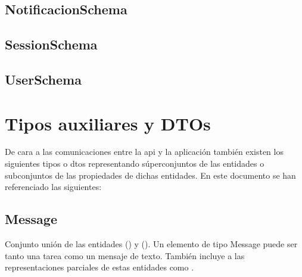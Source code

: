 \subsection{NotificacionSchema}
\label{sch:notification}



\subsection{SessionSchema}
\label{sch:session}


\subsection{UserSchema}
\label{sch:user}




\section{Tipos auxiliares y DTOs}

De cara a las comunicaciones entre la \acrshort{api} y la aplicación también existen los siguientes tipos o \acrshort{dto}s representando súperconjuntos de las entidades o subconjuntos de las propiedades de dichas entidades. En este documento se han referenciado las siguientes:

\subsection{Message}
\label{dto:message}

Conjunto unión de las entidades  () y  (). Un elemento de tipo Message puede ser tanto una tarea como un mensaje de texto. También incluye a las representaciones parciales de estas entidades como .



